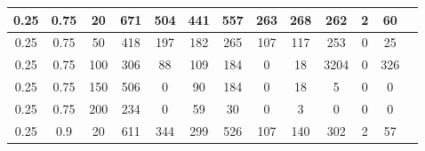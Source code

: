 \begin{table}[H]
\begin{tabular}{|c|c|c|c|c|c|c|c|c|c|c|c|c|}
0.25 & 0.75 & 20 & 671 & 504 & 441 & 557 & 263 & 268 & 262 & 2 & 60 \\ \hline
0.25 & 0.75 & 50 & 418 & 197 & 182 & 265 & 107 & 117 & 253 & 0 & 25 \\ \hline
0.25 & 0.75 & 100 & 306 & 88 & 109 & 184 & 0 & 18 & 3204 & 0 & 326 \\ \hline
0.25 & 0.75 & 150 & 506 & 0 & 90 & 184 & 0 & 18 & 5 & 0 & 0 \\ \hline
0.25 & 0.75 & 200 & 234 & 0 & 59 & 30 & 0 & 3 & 0 & 0 & 0 \\ \hline
0.25 & 0.9 & 20 & 611 & 344 & 299 & 526 & 107 & 140 & 302 & 2 & 57 \\ \hline
\end{tabular}
\label{tab:experiment_results}
\end{table}


